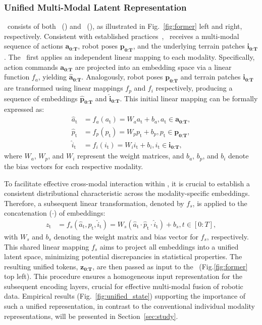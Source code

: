 \subsubsection{Unified Multi-Modal Latent Representation}
\label{sec:unified}
\former~consists of both \encoder~(\coder) and \decoder~(\vertidecoder), as illustrated in Fig.~\ref{fig:former} left and right, respectively. Consistent with established practices~\cite{datar2024terrainattentive,nazeri2024vertiencoder}, \former~receives a multi-modal sequence of actions $\mathbf{a_{\text{0:T}}}$, robot poses $\mathbf{p_{\text{0:T}}}$, and the underlying terrain patches $\mathbf{i_{\text{0:T}}}$. The \coder~first applies an independent linear mapping to each modality. Specifically, action commands $\mathbf{a_{\text{0:T}}}$ are projected into an embedding space via a linear function $f_a$, yielding $\mathbf{\hat{a}_{\text{0:T}}}$. Analogously, robot poses $\mathbf{p_{\text{0:T}}}$ and terrain patches $\mathbf{i_{\text{0:T}}}$ are transformed using linear mappings $f_p$ and $f_i$ respectively, producing a sequence of embeddings $\mathbf{\hat{p}_{\text{0:T}}}$ and $\mathbf{\hat{i}_{\text{0:T}}}$. This initial linear mapping can be formally expressed as:
\begin{align}
\hat{a}_{\text{t}} &= f_a(a_{\text{t}}) = W_a a_{\text{t}} + b_a , a_{\text{t}} \in  \mathbf{a_{\text{0:T}}}, \\
\hat{p}_{\text{t}} &= f_p(p_{\text{t}}) = W_p p_{\text{t}} + b_p , p_{\text{t}} \in \mathbf{p_{\text{0:T}}}, \\
\hat{i}_{\text{t}} &= f_i(i_{\text{t}}) = W_i i_{\text{t}} + b_i , i_{\text{t}} \in \mathbf{i_{\text{0:T}}},
\end{align}
where $W_a$, $W_p$, and $W_i$ represent the weight matrices, and $b_a$, $b_p$, and $b_i$ denote the bias vectors for each respective modality.

To facilitate effective cross-modal interaction within \former, it is crucial to establish a consistent distributional characteristic across the modality-specific embeddings. Therefore, a subsequent linear transformation, denoted by 
$f_s$, is applied to the concatenation ($\cdot$) of embeddings:
\begin{align}
z_{\text{t}} &= f_s(\hat{a}_{\text{t}}, \hat{p}_{\text{t}}, \hat{i}_{\text{t}}) = W_s(\hat{a}_{\text{t}} \cdot \hat{p}_{\text{t}} \cdot \hat{i}_{\text{t}}) + b_s , t \in [0:T],
\end{align}
with $W_s$ and $b_s$ denoting the weight matrix and bias vector for $f_s$, respectively. This shared linear mapping $f_s$ aims to project all embeddings into a unified latent space, minimizing potential discrepancies in statistical properties. The resulting unified tokens, $\mathbf{z_{\text{0:T}}}$, are then passed as input to the \coder~(Fig.\ref{fig:former} top left). This procedure ensures a homogeneous input representation for the subsequent encoding layers, crucial for effective multi-modal fusion of robotic data. Empirical results (Fig.~\ref{fig:unified_state}) supporting the importance of such a unified representation, in contrast to the conventional individual modality representations, will be presented in Section~\ref{sec:study}. 


